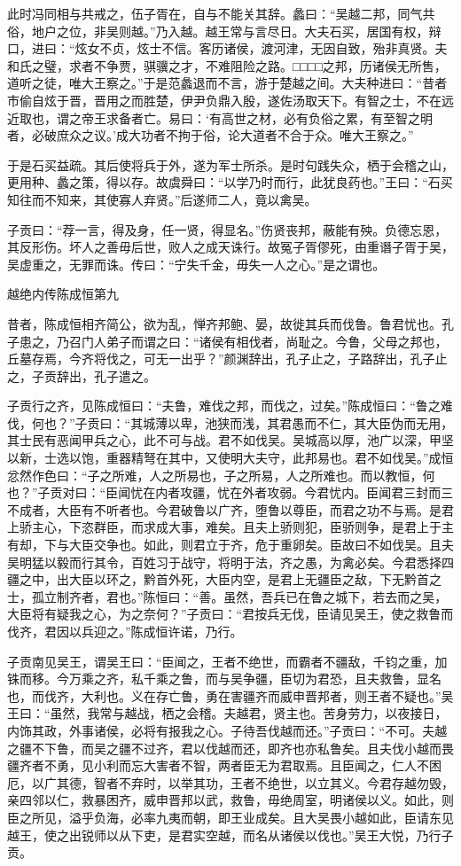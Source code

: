 \documentclass[12pt,UTF8]{ctexbook}
\begin{document}
此时冯同相与共戒之，伍子胥在，自与不能关其辞。蠡曰：“吴越二邦，同气共俗，地户之位，非吴则越。”乃入越。越王常与言尽日。大夫石买，居国有权，辩口，进曰：“炫女不贞，炫士不信。客历诸侯，渡河津，无因自致，殆非真贤。夫和氏之璧，求者不争贾，骐骥之才，不难阻险之路。□□□□之邦，历诸侯无所售，道听之徒，唯大王察之。”于是范蠡退而不言，游于楚越之间。大夫种进曰：“昔者市偷自炫于晋，晋用之而胜楚，伊尹负鼎入殷，遂佐汤取天下。有智之士，不在远近取也，谓之帝王求备者亡。易曰：‘有高世之材，必有负俗之累，有至智之明者，必破庶众之议。’成大功者不拘于俗，论大道者不合于众。唯大王察之。”

于是石买益疏。其后使将兵于外，遂为军士所杀。是时句践失众，栖于会稽之山，更用种、蠡之策，得以存。故虞舜曰：“以学乃时而行，此犹良药也。”王曰：“石买知往而不知来，其使寡人弃贤。”后遂师二人，竟以禽吴。

子贡曰：“荐一言，得及身，任一贤，得显名。”伤贤丧邦，蔽能有殃。负德忘恩，其反形伤。坏人之善毋后世，败人之成天诛行。故冤子胥僇死，由重谮子胥于吴，吴虚重之，无罪而诛。传曰：“宁失千金，毋失一人之心。”是之谓也。

越绝内传陈成恒第九

昔者，陈成恒相齐简公，欲为乱，惮齐邦鲍、晏，故徙其兵而伐鲁。鲁君忧也。孔子患之，乃召门人弟子而谓之曰：“诸侯有相伐者，尚耻之。今鲁，父母之邦也，丘墓存焉，今齐将伐之，可无一出乎？”颜渊辞出，孔子止之，子路辞出，孔子止之，子贡辞出，孔子遣之。

子贡行之齐，见陈成恒曰：“夫鲁，难伐之邦，而伐之，过矣。”陈成恒曰：“鲁之难伐，何也？”子贡曰：“其城薄以卑，池狭而浅，其君愚而不仁，其大臣伪而无用，其士民有恶闻甲兵之心，此不可与战。君不如伐吴。吴城高以厚，池广以深，甲坚以新，士选以饱，重器精弩在其中，又使明大夫守，此邦易也。君不如伐吴。”成恒忿然作色曰：“子之所难，人之所易也，子之所易，人之所难也。而以教恒，何也？”子贡对曰：“臣闻忧在内者攻疆，忧在外者攻弱。今君忧内。臣闻君三封而三不成者，大臣有不听者也。今君破鲁以广齐，堕鲁以尊臣，而君之功不与焉。是君上骄主心，下恣群臣，而求成大事，难矣。且夫上骄则犯，臣骄则争，是君上于主有却，下与大臣交争也。如此，则君立于齐，危于重卵矣。臣故曰不如伐吴。且夫吴明猛以毅而行其令，百姓习于战守，将明于法，齐之愚，为禽必矣。今君悉择四疆之中，出大臣以环之，黔首外死，大臣内空，是君上无疆臣之敌，下无黔首之士，孤立制齐者，君也。”陈恒曰：“善。虽然，吾兵已在鲁之城下，若去而之吴，大臣将有疑我之心，为之奈何？”子贡曰：“君按兵无伐，臣请见吴王，使之救鲁而伐齐，君因以兵迎之。”陈成恒许诺，乃行。

子贡南见吴王，谓吴王曰：“臣闻之，王者不绝世，而霸者不疆敌，千钧之重，加铢而移。今万乘之齐，私千乘之鲁，而与吴争疆，臣切为君恐，且夫救鲁，显名也，而伐齐，大利也。义在存亡鲁，勇在害疆齐而威申晋邦者，则王者不疑也。”吴王曰：“虽然，我常与越战，栖之会稽。夫越君，贤主也。苦身劳力，以夜接日，内饰其政，外事诸侯，必将有报我之心。子待吾伐越而还。”子贡曰：“不可。夫越之疆不下鲁，而吴之疆不过齐，君以伐越而还，即齐也亦私鲁矣。且夫伐小越而畏疆齐者不勇，见小利而忘大害者不智，两者臣无为君取焉。且臣闻之，仁人不困厄，以广其德，智者不弃时，以举其功，王者不绝世，以立其义。今君存越勿毁，亲四邻以仁，救暴困齐，威申晋邦以武，救鲁，毋绝周室，明诸侯以义。如此，则臣之所见，溢乎负海，必率九夷而朝，即王业成矣。且大吴畏小越如此，臣请东见越王，使之出锐师以从下吏，是君实空越，而名从诸侯以伐也。”吴王大悦，乃行子贡。
\end{document}
